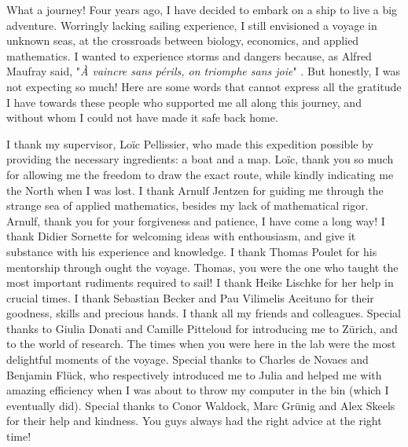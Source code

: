 %
\label{sec:acknowledgement}


What a journey!
% 
Four years ago, I have decided to embark on a ship to live a big adventure.
% 
Worringly lacking sailing experience, I still envisioned a voyage in unknown seas, at the crossroads between biology, economics, and applied mathematics.
% 
I wanted to experience storms and dangers because, as Alfred Maufray said, "\textit{À vaincre sans périls, on triomphe sans joie}" \citep{maufrais1997aventures}.
% 
But honestly, I was not expecting so much!
% 
Here are some words that cannot express all the gratitude I have towards these people who supported me all along this journey, and without whom I could not have made it safe back home.

I thank my supervisor, Loïc Pellissier, who made this expedition possible by providing the necessary ingredients: a boat and a map. Loïc, thank you so much for allowing me the freedom to draw the exact route, while kindly indicating me the North when I was lost.
% 
I thank Arnulf Jentzen for guiding me through the strange sea of applied mathematics, besides my lack of mathematical rigor. Arnulf, thank you for your forgiveness and patience, I have come a long way!
% 
I thank Didier Sornette for welcoming ideas with enthousiasm, and give it substance with his experience and knowledge.
% 
I thank Thomas Poulet for his mentorship through ought the voyage. Thomas, you were the one who taught the most important rudiments required to sail! 
% 
I thank Heike Lischke for her help in crucial times.
% 
I thank Sebastian Becker and Pau Vilimelis Aceituno for their goodness, skills and precious hands.
% 
I thank all my friends and colleagues. Special thanks to Giulia Donati and Camille Pitteloud for introducing me to Zürich, and to the world of research. The times when you were here in the lab were the most delightful moments of the voyage.
% 
Special thanks to Charles de Novaes and Benjamin Flück, who respectively introduced me to Julia and helped me with amazing efficiency when I was about to throw my computer in the bin (which I eventually did).
% 
Special thanks to Conor Waldock, Marc Grünig and Alex Skeels for their help and kindness. You guys always had the right advice at the right time!

